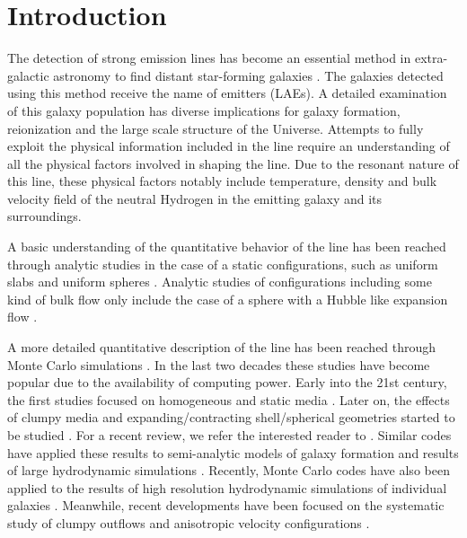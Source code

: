 \documentclass{emulateapj}
\newcommand{\ly}{{\ifmmode{{\rm Ly}\alpha~}\else{Ly$\alpha$~}\fi}}
\begin{document}
\section{Introduction}
\label{sec:intro}

The detection of strong \ly emission lines has become an essential
method in extra-galactic astronomy to find distant star-forming
galaxies
\citep{PartridgePeebles,Rhoads00,Gawiser2007,Koehler2007,Ouchi08,Yamada2012,Schenker2012,Finkelstein2013}.
The galaxies detected using this method receive the 
name of \ly emitters (LAEs). 
A detailed examination of this galaxy population has diverse
implications for galaxy formation, reionization and the large scale
structure of the Universe.  
Attempts to fully exploit the physical information included in the \ly
line require an understanding of all the physical factors involved in
shaping the  line. 
Due to the resonant nature of this line, these physical factors
notably include temperature, density and bulk velocity field of the
neutral Hydrogen in the emitting galaxy and its surroundings.

A basic understanding of the quantitative behavior of the \ly line
has been reached through analytic studies in the case of a static
configurations, such as uniform slabs
\citep[][]{Adams72,Harrington73,Neufeld90} and uniform spheres
\citep{Dijkstra06}. 
Analytic studies of configurations including some kind of bulk flow
only include the case of a sphere with a Hubble like expansion flow
\citep{LoebRybicki}.  

A more detailed quantitative description of the \ly line has been
reached through Monte Carlo simulations \citep{Auer68,Avery68,Adams72}. 
In the last two decades these studies have become popular due to the
availability of computing power. 
Early into the 21st century, the first
studies focused on homogeneous and static media
\citep{Ahn00,Ahn01,Zheng02}. 
Later on, the effects of clumpy media \citep{Hansen06} and
expanding/contracting shell/spherical geometries started to be studied
\citep{Ahn03,Verhamme06,Dijkstra06}.  For a recent review, we refer the interested reader to \citet{review}.
Similar codes have applied these results to semi-analytic models of
galaxy formation \citep{Orsi12, Garel2012} and results of large
hydrodynamic simulations \citep{CLARA,Forero12,Behrens13}. 
Recently, Monte Carlo codes have also been applied to the results of
high resolution hydrodynamic simulations of individual galaxies
\citep{Laursen09,Barnes11,Verhamme12,Yajima12}. 
Meanwhile, recent  developments have been focused on the systematic
study of clumpy outflows \citep{DijkstraKramer} and anisotropic
velocity configurations \citep{Zheng2013}. 
\end{document}

